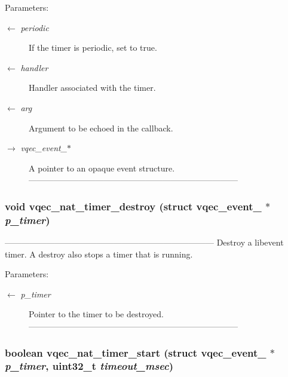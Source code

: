\begin{Desc}
\item[Parameters:]
\begin{description}
\item[\mbox{$\leftarrow$} {\em periodic}]If the timer is periodic, set to true. \item[\mbox{$\leftarrow$} {\em handler}]Handler associated with the timer. \item[\mbox{$\leftarrow$} {\em arg}]Argument to be echoed in the callback. \item[\mbox{$\rightarrow$} {\em vqec\_\-event\_\-$\ast$}]A pointer to an opaque event structure. --------------------------------------------------------------------------- \end{description}
\end{Desc}
\subsubsection{\setlength{\rightskip}{0pt plus 5cm}void vqec\_\-nat\_\-timer\_\-destroy (struct vqec\_\-event\_\- $\ast$ {\em p\_\-timer})}\label{vqec__nat__api_8c_8be27c768eb9f6f160cc82ed0d184e85}


--------------------------------------------------------------------------- Destroy a libevent timer. A destroy also stops a timer that is running.

\begin{Desc}
\item[Parameters:]
\begin{description}
\item[\mbox{$\leftarrow$} {\em p\_\-timer}]Pointer to the timer to be destroyed. --------------------------------------------------------------------------- \end{description}
\end{Desc}
\subsubsection{\setlength{\rightskip}{0pt plus 5cm}boolean vqec\_\-nat\_\-timer\_\-start (struct vqec\_\-event\_\- $\ast$ {\em p\_\-timer}, uint32\_\-t {\em timeout\_\-msec})}\label{vqec__nat__api_8c_abcf1d19e9d57cf33706988e1323ee36}


